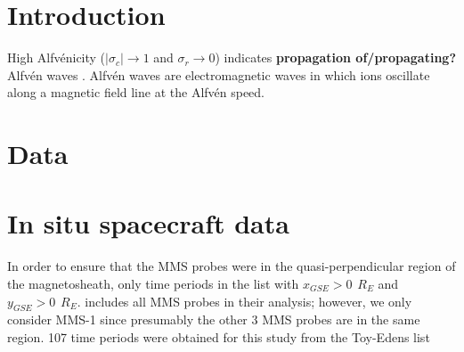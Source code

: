 
\section{Introduction}
High Alfv\'enicity ($|\sigma_c| \rightarrow 1$ and $\sigma_r \rightarrow 0$) indicates \textbf{propagation of/propagating?} Alfv\'en waves \cite{Bavassano:1998}. Alfv\'en waves are electromagnetic waves in which ions oscillate along a magnetic field line at the Alfv\'en speed. 




\section{Data}
\section{ In situ spacecraft data}
In order to ensure that the MMS probes were in the quasi-perpendicular region of the magnetosheath, only time periods in the list with $x_{GSE}>0\hspace{5pt}R_E$ and $y_{GSE}>0\hspace{5pt}R_E$.  includes all MMS probes in their analysis; however, we only consider MMS-1 since presumably the other 3 MMS probes are in the same region. 107 time periods were obtained for this study from the Toy-Edens list 


